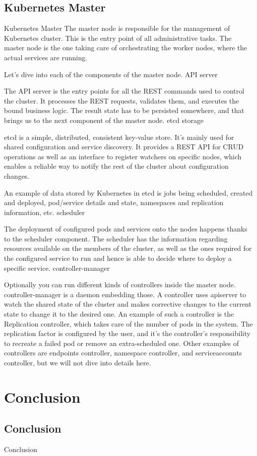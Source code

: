 \documentclass{bredelebeamer}
\begin{document}
\subsection{Kubernetes Master}
\begin{frame}{Kubernetes Master}
The master node is responsible for the management of Kubernetes cluster. This is the entry point of all administrative tasks. The master node is the one taking care of orchestrating the worker nodes, where the actual services are running.

Let's dive into each of the components of the master node.
API server

The API server is the entry points for all the REST commands used to control the cluster. It processes the REST requests, validates them, and executes the bound business logic. The result state has to be persisted somewhere, and that brings us to the next component of the master node.
etcd storage

etcd is a simple, distributed, consistent key-value store. It’s mainly used for shared configuration and service discovery.
It provides a REST API for CRUD operations as well as an interface to register watchers on specific nodes, which enables a reliable way to notify the rest of the cluster about configuration changes.

An example of data stored by Kubernetes in etcd is jobs being scheduled, created and deployed, pod/service details and state, namespaces and replication information, etc.
scheduler

The deployment of configured pods and services onto the nodes happens thanks to the scheduler component.
The scheduler has the information regarding resources available on the members of the cluster, as well as the ones required for the configured service to run and hence is able to decide where to deploy a specific service.
controller-manager

Optionally you can run different kinds of controllers inside the master node. controller-manager is a daemon embedding those.
A controller uses apiserver to watch the shared state of the cluster and makes corrective changes to the current state to change it to the desired one.
An example of such a controller is the Replication controller, which takes care of the number of pods in the system. The replication factor is configured by the user, and it's the controller’s responsibility to recreate a failed pod or remove an extra-scheduled one.
Other examples of controllers are endpoints controller, namespace controller, and serviceaccounts controller, but we will not dive into details here.
\end{frame}


\section{Conclusion}
\subsection{Conclusion}
\begin{frame}{Conclusion}

\end{frame}
\end{document}
